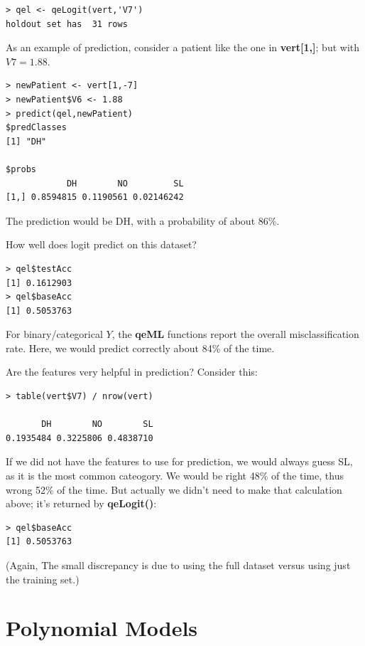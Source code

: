 \begin{lstlisting}
> qel <- qeLogit(vert,'V7')
holdout set has  31 rows
\end{lstlisting}

As an example of prediction, consider a patient like the one in
\textbf{vert[1,]}; but with $V7 = 1.88$.

\begin{lstlisting}
> newPatient <- vert[1,-7]
> newPatient$V6 <- 1.88
> predict(qel,newPatient)
$predClasses
[1] "DH"

$probs
            DH        NO         SL
[1,] 0.8594815 0.1190561 0.02146242
\end{lstlisting}

The prediction would be DH, with a probability of about 86\%.

How well does logit predict on this dataset?

\begin{lstlisting}
> qel$testAcc
[1] 0.1612903
> qel$baseAcc
[1] 0.5053763
\end{lstlisting}


For binary/categorical $Y$, the \textbf{qeML} functions report the
overall misclassification rate.  Here, we would predict correctly about
84\% of the time. 

Are the features very helpful in prediction?  Consider this:

\begin{lstlisting}
> table(vert$V7) / nrow(vert)

       DH        NO        SL 
0.1935484 0.3225806 0.4838710 
\end{lstlisting}

If we did not have the features to use for prediction, we would always
guess SL, as it is the most common cateogory.  We would be right 48\% of
the time, thus wrong 52\% of the time.  But actually we didn't need to
make that calculation above; it's returned by \textbf{qeLogit()}:

\begin{lstlisting}
> qel$baseAcc
[1] 0.5053763
\end{lstlisting}

(Again, The small discrepancy is due to using the full dataset versus
using just the training set.)

\section{Polynomial Models}

